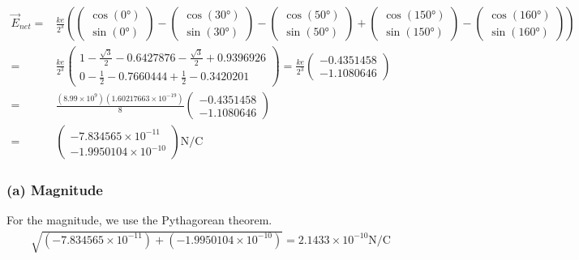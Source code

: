 \documentclass[12pt]{article}
\begin{document}
\begin{align*}
    \vec{E}_{net}   =&  \frac{ke}{2^3}\left(\begin{pmatrix}\cos(0\unit{\degree})\\ \sin(0\unit{\degree})\end{pmatrix}
        - \begin{pmatrix}\cos(30\unit{\degree})\\ \sin(30\unit{\degree})\end{pmatrix}
        - \begin{pmatrix}\cos(50\unit{\degree})\\ \sin(50\unit{\degree})\end{pmatrix}
        + \begin{pmatrix}\cos(150\unit{\degree})\\ \sin(150\unit{\degree})\end{pmatrix}
        - \begin{pmatrix}\cos(160\unit{\degree})\\ \sin(160\unit{\degree})\end{pmatrix}\right)\\
        =&  \frac{ke}{2^3} \begin{pmatrix}
            1   - \frac{\sqrt{3}}{2}    - 0.6427876 - \frac{\sqrt{3}}{2}    + 0.9396926\\
            0   - \frac{1}{2}           - 0.7660444 + \frac{1}{2}           - 0.3420201
        \end{pmatrix}
        =   \frac{ke}{2^3} \begin{pmatrix}
            -0.4351458\\
            -1.1080646
        \end{pmatrix}\\
        =&  \frac{(8.99 \times 10^{9})(1.60217663 \times 10^{-19})}{8}\begin{pmatrix} -0.4351458\\ -1.1080646 \end{pmatrix}\\
        =&  \begin{pmatrix} -7.834565 \times 10^{-11} \\ -1.9950104 \times 10^{-10} \end{pmatrix} \unit{\newton/\coulomb}
\end{align*}

\subsubsection*{(a) Magnitude}
For the magnitude, we use the Pythagorean theorem.
\begin{align*}
    \sqrt{(-7.834565 \times 10^{-11}) + (-1.9950104 \times 10^{-10})} = \boxed{2.1433 \times 10^{-10} \unit{\newton/\coulomb}}
\end{align*}
\end{document}
